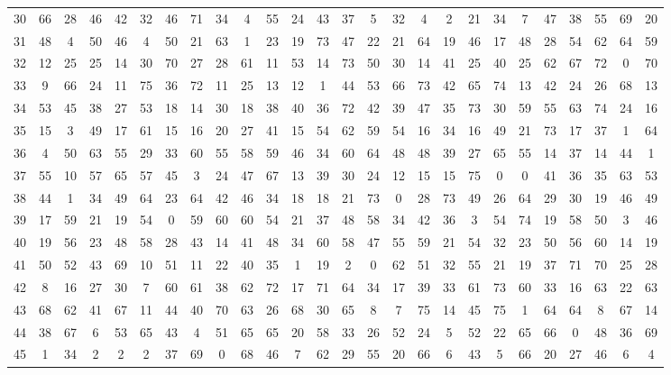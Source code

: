 \begin{table}
\begin{tabular}{c c c c c c c c c c c c c c c c c c c c c c c c c c }
30 & 66 & 28 & 46 & 42 & 32 & 46 & 71 & 34 & 4 & 55 & 24 & 43 & 37 & 5 & 32 & 4 & 2 & 21 & 34 & 7 & 47 & 38 & 55 & 69 & 20 \\
31 & 48 & 4 & 50 & 46 & 4 & 50 & 21 & 63 & 1 & 23 & 19 & 73 & 47 & 22 & 21 & 64 & 19 & 46 & 17 & 48 & 28 & 54 & 62 & 64 & 59 \\
32 & 12 & 25 & 25 & 14 & 30 & 70 & 27 & 28 & 61 & 11 & 53 & 14 & 73 & 50 & 30 & 14 & 41 & 25 & 40 & 25 & 62 & 67 & 72 & 0 & 70 \\
33 & 9 & 66 & 24 & 11 & 75 & 36 & 72 & 11 & 25 & 13 & 12 & 1 & 44 & 53 & 66 & 73 & 42 & 65 & 74 & 13 & 42 & 24 & 26 & 68 & 13 \\
34 & 53 & 45 & 38 & 27 & 53 & 18 & 14 & 30 & 18 & 38 & 40 & 36 & 72 & 42 & 39 & 47 & 35 & 73 & 30 & 59 & 55 & 63 & 74 & 24 & 16 \\
35 & 15 & 3 & 49 & 17 & 61 & 15 & 16 & 20 & 27 & 41 & 15 & 54 & 62 & 59 & 54 & 16 & 34 & 16 & 49 & 21 & 73 & 17 & 37 & 1 & 64 \\
36 & 4 & 50 & 63 & 55 & 29 & 33 & 60 & 55 & 58 & 59 & 46 & 34 & 60 & 64 & 48 & 48 & 39 & 27 & 65 & 55 & 14 & 37 & 14 & 44 & 1 \\
37 & 55 & 10 & 57 & 65 & 57 & 45 & 3 & 24 & 47 & 67 & 13 & 39 & 30 & 24 & 12 & 15 & 15 & 75 & 0 & 0 & 41 & 36 & 35 & 63 & 53 \\
38 & 44 & 1 & 34 & 49 & 64 & 23 & 64 & 42 & 46 & 34 & 18 & 18 & 21 & 73 & 0 & 28 & 73 & 49 & 26 & 64 & 29 & 30 & 19 & 46 & 49 \\
39 & 17 & 59 & 21 & 19 & 54 & 0 & 59 & 60 & 60 & 54 & 21 & 37 & 48 & 58 & 34 & 42 & 36 & 3 & 54 & 74 & 19 & 58 & 50 & 3 & 46 \\
40 & 19 & 56 & 23 & 48 & 58 & 28 & 43 & 14 & 41 & 48 & 34 & 60 & 58 & 47 & 55 & 59 & 21 & 54 & 32 & 23 & 50 & 56 & 60 & 14 & 19 \\
41 & 50 & 52 & 43 & 69 & 10 & 51 & 11 & 22 & 40 & 35 & 1 & 19 & 2 & 0 & 62 & 51 & 32 & 55 & 21 & 19 & 37 & 71 & 70 & 25 & 28 \\
42 & 8 & 16 & 27 & 30 & 7 & 60 & 61 & 38 & 62 & 72 & 17 & 71 & 64 & 34 & 17 & 39 & 33 & 61 & 73 & 60 & 33 & 16 & 63 & 22 & 63 \\
43 & 68 & 62 & 41 & 67 & 11 & 44 & 40 & 70 & 63 & 26 & 68 & 30 & 65 & 8 & 7 & 75 & 14 & 45 & 75 & 1 & 64 & 64 & 8 & 67 & 14 \\
44 & 38 & 67 & 6 & 53 & 65 & 43 & 4 & 51 & 65 & 65 & 20 & 58 & 33 & 26 & 52 & 24 & 5 & 52 & 22 & 65 & 66 & 0 & 48 & 36 & 69 \\
45 & 1 & 34 & 2 & 2 & 2 & 37 & 69 & 0 & 68 & 46 & 7 & 62 & 29 & 55 & 20 & 66 & 6 & 43 & 5 & 66 & 20 & 27 & 46 & 6 & 4 \\

\end{tabular}
\end{table}
